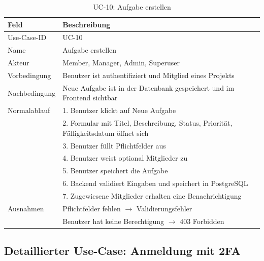 \begin{table}[H]
    \centering
    \caption{UC-10: Aufgabe erstellen}
    \begin{tabularx}{\textwidth}{lX}
        \toprule
        \textbf{Feld} & \textbf{Beschreibung} \\
        \midrule
        Use-Case-ID   & UC-10 \\
        Name          & Aufgabe erstellen \\
        Akteur        & Member, Manager, Admin, Superuser \\
        Vorbedingung  & Benutzer ist authentifiziert und Mitglied
                        eines Projekts \\
        Nachbedingung & Neue Aufgabe ist in der Datenbank gespeichert
                        und im Frontend sichtbar \\
        Normalablauf  & 1. Benutzer klickt auf \glqq{}Neue Aufgabe\grqq{} \\
                      & 2. Formular mit Titel, Beschreibung, Status,
                           Priorität, Fälligkeitsdatum öffnet sich \\
                      & 3. Benutzer füllt Pflichtfelder aus \\
                      & 4. Benutzer weist optional Mitglieder zu \\
                      & 5. Benutzer speichert die Aufgabe \\
                      & 6. Backend validiert Eingaben und speichert
                           in PostgreSQL \\
                      & 7. Zugewiesene Mitglieder erhalten eine
                           Benachrichtigung \\
        Ausnahmen     & Pflichtfelder fehlen $\rightarrow$ Validierungsfehler \\
                      & Benutzer hat keine Berechtigung $\rightarrow$
                        403 Forbidden \\
        \bottomrule
    \end{tabularx}
    \label{tab:uc10}
\end{table}

\subsection{Detaillierter Use-Case: Anmeldung mit 2FA}

